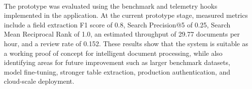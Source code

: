 \paragraph{} The prototype was evaluated using the benchmark and telemetry hooks implemented in the application. At the current prototype stage, measured metrics include a field extraction F1 score of 0.8, Search Precision@5 of 0.25, Search Mean Reciprocal Rank of 1.0, an estimated throughput of 29.77 documents per hour, and a review rate of 0.152. These results show that the system is suitable as a working proof of concept for intelligent document processing, while also identifying areas for future improvement such as larger benchmark datasets, model fine-tuning, stronger table extraction, production authentication, and cloud-scale deployment.
